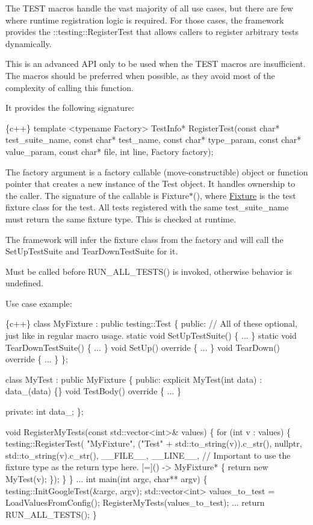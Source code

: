The {\ttfamily T\+E\+ST} macros handle the vast majority of all use cases, but there are few where runtime registration logic is required. For those cases, the framework provides the {\ttfamily \+::testing\+::\+Register\+Test} that allows callers to register arbitrary tests dynamically.

This is an advanced A\+PI only to be used when the {\ttfamily T\+E\+ST} macros are insufficient. The macros should be preferred when possible, as they avoid most of the complexity of calling this function.

It provides the following signature\+:


\begin{DoxyCode}
\{c++\}
template <typename Factory>
TestInfo* RegisterTest(const char* test\_suite\_name, const char* test\_name,
                       const char* type\_param, const char* value\_param,
                       const char* file, int line, Factory factory);
\end{DoxyCode}


The {\ttfamily factory} argument is a factory callable (move-\/constructible) object or function pointer that creates a new instance of the Test object. It handles ownership to the caller. The signature of the callable is {\ttfamily Fixture$\ast$()}, where {\ttfamily \mbox{\hyperlink{classFixture}{Fixture}}} is the test fixture class for the test. All tests registered with the same {\ttfamily test\+\_\+suite\+\_\+name} must return the same fixture type. This is checked at runtime.

The framework will infer the fixture class from the factory and will call the {\ttfamily Set\+Up\+Test\+Suite} and {\ttfamily Tear\+Down\+Test\+Suite} for it.

Must be called before {\ttfamily R\+U\+N\+\_\+\+A\+L\+L\+\_\+\+T\+E\+S\+T\+S()} is invoked, otherwise behavior is undefined.

Use case example\+:


\begin{DoxyCode}
\{c++\}
class MyFixture : public testing::Test \{
 public:
  // All of these optional, just like in regular macro usage.
  static void SetUpTestSuite() \{ ... \}
  static void TearDownTestSuite() \{ ... \}
  void SetUp() override \{ ... \}
  void TearDown() override \{ ... \}
\};

class MyTest : public MyFixture \{
 public:
  explicit MyTest(int data) : data\_(data) \{\}
  void TestBody() override \{ ... \}

 private:
  int data\_;
\};

void RegisterMyTests(const std::vector<int>& values) \{
  for (int v : values) \{
    testing::RegisterTest(
        "MyFixture", ("Test" + std::to\_string(v)).c\_str(), nullptr,
        std::to\_string(v).c\_str(),
        \_\_FILE\_\_, \_\_LINE\_\_,
        // Important to use the fixture type as the return type here.
        [=]() -> MyFixture* \{ return new MyTest(v); \});
  \}
\}
...
int main(int argc, char** argv) \{
  testing::InitGoogleTest(&argc, argv);
  std::vector<int> values\_to\_test = LoadValuesFromConfig();
  RegisterMyTests(values\_to\_test);
  ...
  return RUN\_ALL\_TESTS();
\}
\end{DoxyCode}


